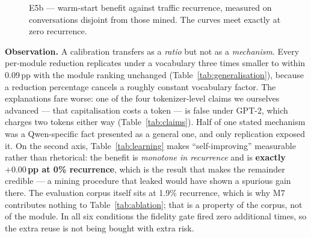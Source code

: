 \documentclass[11pt,a4paper]{article}
\newcommand{\obs}[1]{%
  \par\vspace{2pt}
  \noindent\begin{tcolorbox}[colback=soft,colframe=accent,boxrule=0pt,
    leftrule=2.2pt,arc=0pt,left=7pt,right=5pt,top=4pt,bottom=4pt,breakable]
  \small\textbf{Observation.} #1
  \end{tcolorbox}\par\vspace{2pt}}
\begin{document}
\begin{figure}[htbp]
\centering
{}
\caption{E5b --- warm-start benefit against traffic recurrence, measured on
conversations disjoint from those mined. The curves meet exactly at zero
recurrence.}
\label{fig:learning}
\end{figure}

\obs{A calibration transfers as a \emph{ratio} but not as a \emph{mechanism}.
Every per-module reduction replicates under a vocabulary three times smaller to
within 0.09\,pp with the module ranking unchanged (Table~\ref{tab:generalisation}),
because a reduction percentage cancels a roughly constant vocabulary factor. The
explanations fare worse: one of the four tokenizer-level claims we ourselves
advanced --- that capitalisation costs a token --- is false under GPT-2, which
charges two tokens either way (Table~\ref{tab:claims}). Half of one stated
mechanism was a Qwen-specific fact presented as a general one, and only
replication exposed it. On the second axis, Table~\ref{tab:learning} makes
``self-improving'' measurable rather than rhetorical: the benefit is
\emph{monotone in recurrence} and is \textbf{exactly $+0.00$\,pp at 0\%
recurrence}, which is the result that makes the remainder credible --- a mining
procedure that leaked would have shown a spurious gain there. The evaluation
corpus itself sits at 1.9\% recurrence, which is why M7 contributes nothing to
Table~\ref{tab:ablation}; that is a property of the corpus, not of the module. In
all six conditions the fidelity gate fired zero additional times, so the extra
reuse is not being bought with extra risk.}
\end{document}
